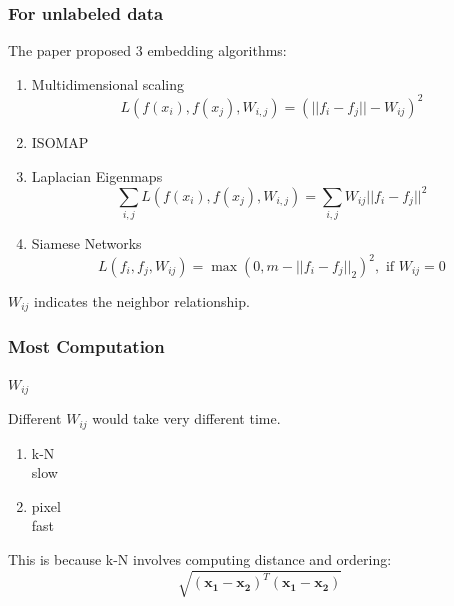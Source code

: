 \documentclass{beamer}
\begin{document}
\begin{frame}
\frametitle{For unlabeled data}

The paper proposed 3 embedding algorithms:

\begin{enumerate}
\item Multidimensional scaling \\ 

$$ L(f(x_i), f(x_j), W_{i,j}) = (||f_i - f_j|| - W_{ij})^2 $$
\item ISOMAP  \\
\item Laplacian Eigenmaps  \\ 

$$ \sum_{i,j} L(f(x_i), f(x_j), W_{i,j}) = \sum_{i,j} W_{ij} ||f_i - f_j||^2 $$
\item Siamese Networks \\

$$ L(f_i, f_j , W_{ij}) = \max(0, m - ||f_{i} - f_{j}||_2)^2,  \text{ if } W_{ij} = 0 $$
\end{enumerate}

$W_{ij}$ indicates the neighbor relationship.

\end{frame}
\begin{frame}
\frametitle{Most Computation}

$W_{ij}$\\

\bigskip

Different $W_{ij}$ would take very different time.\\

\begin{enumerate}
\item k-N \\ 
slow\\
\item pixel  \\
fast\\
\end{enumerate}

This is because k-N involves computing distance and ordering:\\

$$ \sqrt{ (\mathbf{x_1} - \mathbf{x_2})^T (\mathbf{x_1} - \mathbf{x_2}) } $$

\end{frame}
\end{document}
